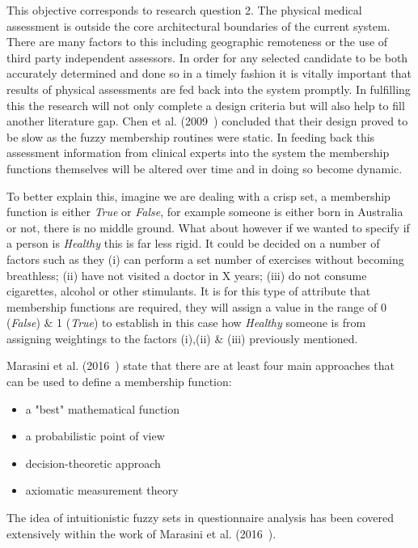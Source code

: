 This objective corresponds to research question 2. The physical medical assessment is outside the core architectural boundaries of the current system. There are many factors to this including geographic remoteness or the use of third party independent assessors. In order for any selected candidate to be both accurately determined and done so in a timely fashion it is vitally important that results of physical assessments are fed back into the system promptly. In fulfilling this the research will not only complete a design criteria but will also help to fill another literature gap. Chen et al. (2009~\cite{chen2009mining}) concluded that their design proved to be slow as the fuzzy membership routines were static. In feeding back this assessment information from clinical experts into the system the membership functions themselves will be altered over time and in doing so become dynamic.

To better explain this, imagine we are dealing with a crisp set, a membership function is either \textit{True} or \textit{False}, for example someone is either born in Australia or not, there is no middle ground. What about however if we wanted to specify if a person is \textit{Healthy} this is far less rigid. It could be decided on a number of factors such as they (i) can perform a set number of exercises without becoming breathless; (ii) have not visited a doctor in X years; (iii) do not consume cigarettes, alcohol or other stimulants. It is for this type of attribute that membership functions are required, they will assign a value in the range of 0 (\textit{False}) \& 1 (\textit{True}) to establish in this case how \textit{Healthy} someone is from assigning weightings to the factors (i),(ii) \& (iii) previously mentioned.

Marasini et al. (2016~\cite{marasini2016intuitionistic}) state that there are at least four main approaches that can be used
to define a membership function:

\begin{itemize}
    \item a "best" mathematical function
    \item a probabilistic point of view
    \item decision-theoretic approach
    \item axiomatic measurement theory
\end{itemize}

The idea of intuitionistic fuzzy sets in questionnaire analysis has been covered extensively within the work of Marasini et al. (2016~\cite{marasini2016intuitionistic}).

